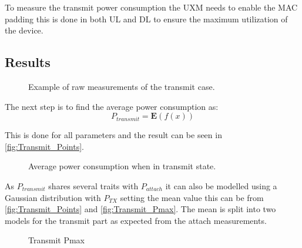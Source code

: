 To measure the transmit power consumption the UXM needs to enable the MAC padding this is done in both UL and DL to ensure the maximum utilization of the device. 



\subsection{Results}
\begin{figure}[H]
\centering
{}
\resizebox{0.6\textwidth}{!}{
}
\caption{Example of raw measurements of the transmit case.}
\label{fig:Transmit_raw}
\end{figure}

The next step is to find the average power consumption as:
\begin{equation}
P_{transmit} = \mathbf{E}(f(x))
\end{equation}
\begin{where}
\end{where}

This is done for all parameters and the result can be seen in \autoref{fig:Transmit_Points}.

\begin{figure}[H]
\centering
\begin{minipage}{0.48\textwidth}
\resizebox{\textwidth}{!}{
}
\end{minipage}
\hfill
\begin{minipage}{0.48\textwidth}
\resizebox{\textwidth}{!}{
}
\end{minipage}
\caption{Average power consumption when in transmit state.}
\label{fig:Transmit_Points}
\end{figure}

As $P_{transmit}$ shares several traits with $P_{attach}$ it can also be modelled using a Gaussian distribution with $P_{TX}$ setting the mean value this can be from \autoref{fig:Transmit_Points} and \autoref{fig:Transmit_Pmax}. The mean is split into two models for the transmit part as expected from the attach measurements. 

\begin{figure}[H]
\centering
{}
\resizebox{0.7\textwidth}{!}{
}
\caption{Transmit Pmax}
\label{fig:Transmit_Pmax}
\end{figure}

